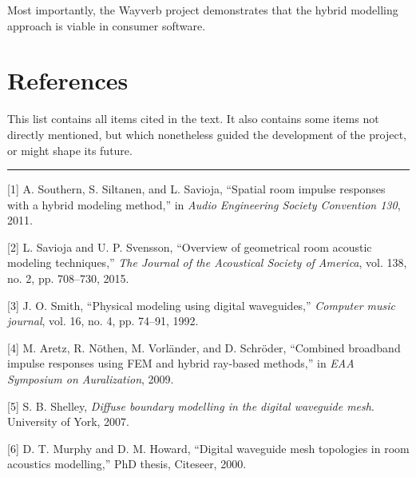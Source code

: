 \documentclass[]{scrreprt}
\begin{document}
Most importantly, the Wayverb project demonstrates that the hybrid
modelling approach is viable in consumer software.

\chapter*{References}\label{references}

This list contains all items cited in the text. It also contains some
items not directly mentioned, but which nonetheless guided the
development of the project, or might shape its future.

\begin{center}\rule{0.5\linewidth}{\linethickness}\end{center}

\noindent
\vspace{-2em} \setlength{\parindent}{-0.5in}
\setlength{\leftskip}{0.5in} \setlength{\parskip}{15pt}

\let\oldhypertarget\hypertarget

\renewcommand{\hypertarget}[2]{ \leavevmode \oldhypertarget{#1}{#2} }

\hypertarget{refs}{}
\hypertarget{ref-southernux5fspatialux5f2011}{}
{[}1{]} A. Southern, S. Siltanen, and L. Savioja, ``Spatial room impulse
responses with a hybrid modeling method,'' in \emph{Audio Engineering
Society Convention 130}, 2011.

\hypertarget{ref-saviojaux5foverviewux5f2015}{}
{[}2{]} L. Savioja and U. P. Svensson, ``Overview of geometrical room
acoustic modeling techniques,'' \emph{The Journal of the Acoustical
Society of America}, vol. 138, no. 2, pp. 708--730, 2015.

\hypertarget{ref-smithux5fphysicalux5f1992}{}
{[}3{]} J. O. Smith, ``Physical modeling using digital waveguides,''
\emph{Computer music journal}, vol. 16, no. 4, pp. 74--91, 1992.

\hypertarget{ref-aretzux5fcombinedux5f2009}{}
{[}4{]} M. Aretz, R. Nöthen, M. Vorländer, and D. Schröder, ``Combined
broadband impulse responses using FEM and hybrid ray-based methods,'' in
\emph{EAA Symposium on Auralization}, 2009.

\hypertarget{ref-shelleyux5fdiffuseux5f2007}{}
{[}5{]} S. B. Shelley, \emph{Diffuse boundary modelling in the digital
waveguide mesh}. University of York, 2007.

\hypertarget{ref-murphyux5fdigitalux5f2000}{}
{[}6{]} D. T. Murphy and D. M. Howard, ``Digital waveguide mesh
topologies in room acoustics modelling,'' PhD thesis, Citeseer, 2000.
\end{document}
